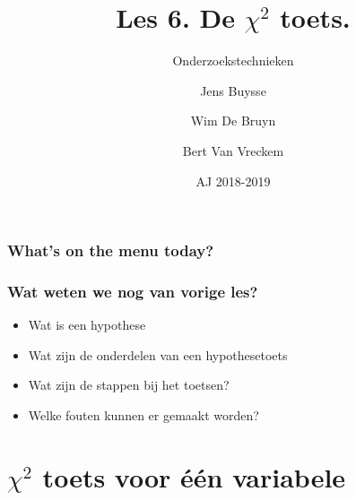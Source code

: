\documentclass[aspectratio=169]{beamer}
\title[OZT: chi-kwadraat]{Les 6. De $\chi^{2}$ toets.}
\subtitle{Onderzoekstechnieken}
\author{Jens Buysse \and Wim {De Bruyn} \and Bert {Van Vreckem}}
\date{AJ 2018-2019}
\begin{document}

\begin{frame}
\maketitle
\end{frame}

\begin{frame}
\frametitle{What's on the menu today?}

\tableofcontents
\end{frame}


\begin{frame}
  \frametitle{Wat weten we nog van vorige les?}

  \begin{itemize}
    \item Wat is een hypothese
    \item Wat zijn de onderdelen van een hypothesetoets
    \item Wat zijn de stappen bij het toetsen?
    \item Welke fouten kunnen er gemaakt worden?
  \end{itemize}
\end{frame}

\section{$\chi^{2}$ toets voor één variabele}
\end{document}
